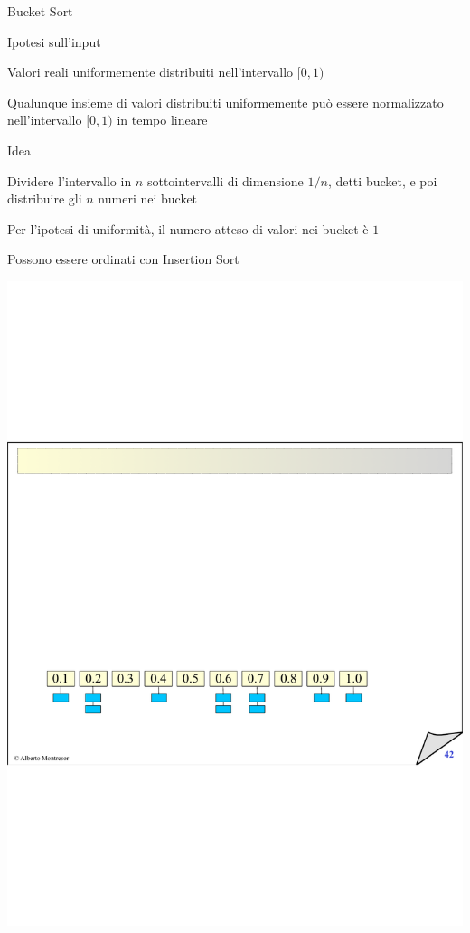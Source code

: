 \begin{frame}[shrink]{Bucket Sort}

\begin{block}{Ipotesi sull'input}
\BI
\item Valori reali uniformemente distribuiti nell'intervallo $[0, 1)$
\item Qualunque insieme di valori distribuiti uniformemente può essere normalizzato nell'intervallo $[0, 1)$ in tempo lineare
\EI
\end{block}

\begin{block}{Idea}
\BI
\item Dividere l'intervallo in $n$ sottointervalli di dimensione $1/n$, detti \alert{bucket}, e poi distribuire gli $n$ numeri nei bucket
\item Per l'ipotesi di uniformità, il numero atteso di valori nei bucket è $1$
\item Possono essere ordinati con Insertion Sort
\EI
\end{block}

\bigskip
\includegraphics[width=\textwidth]{bucket.pdf}	

\end{frame}%


